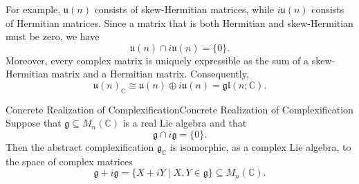 \documentclass[../main.tex]{subfiles}
\begin{document}
\begin{remark}
  For example, $\mathfrak{u}(n)$ consists of skew-Hermitian matrices, while $i\mathfrak{u}(n)$ consists of Hermitian matrices. Since a matrix that is both Hermitian and skew-Hermitian must be zero, we have
  \begin{equation}
    \mathfrak{u}(n)\cap i\mathfrak{u}(n)=\{0\}.
  \end{equation}
  Moreover, every complex matrix is uniquely expressible as the sum of a skew-Hermitian matrix and a Hermitian matrix. Consequently,
  \begin{equation}
    \mathfrak{u}(n)_{\mathbb{C}}
    \cong\mathfrak{u}(n)\oplus i\mathfrak{u}(n)
    =\mathfrak{gl}(n;\mathbb{C}).
  \end{equation}
\end{remark}

\begin{proposition}{Concrete Realization of Complexification}{Concrete Realization of Complexification}
  Suppose that $\mathfrak{g}\subseteq M_n(\mathbb{C})$ is a real Lie algebra and that
  \begin{equation}
    \mathfrak{g}\cap i\mathfrak{g}=\{0\}.
  \end{equation}
  Then the abstract complexification $\mathfrak{g}_{\mathbb{C}}$ is isomorphic, as a complex Lie algebra, to the space of complex matrices
  \begin{equation}
    \mathfrak{g}+i\mathfrak{g}
    =\{X+iY\mid X,Y\in\mathfrak{g}\}
    \subseteq M_n(\mathbb{C}).
  \end{equation}
\end{proposition}
\end{document}
